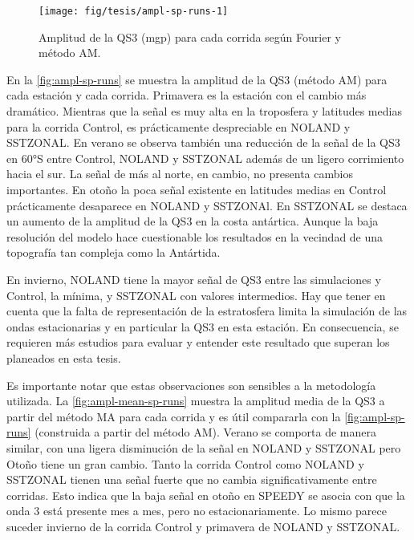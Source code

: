 \documentclass[spanish,a4paper,12pt,oneside]{book}
\begin{document}
\begin{landscape}\begin{figure}

{\centering \texttt{[image: fig/tesis/ampl-sp-runs-1]} 

}

\caption{Amplitud de la QS3 (mgp) para cada corrida según Fourier y método AM.}\label{fig:ampl-sp-runs}
\end{figure}
\end{landscape}

En la \autoref{fig:ampl-sp-runs} se muestra la amplitud de la QS3
(método AM) para cada estación y cada corrida. Primavera es la estación
con el cambio más dramático. Mientras que la señal es muy alta en la
troposfera y latitudes medias para la corrida Control, es prácticamente
despreciable en NOLAND y SSTZONAL. En verano se observa también una
reducción de la señal de la QS3 en 60°S entre Control, NOLAND y SSTZONAL
además de un ligero corrimiento hacia el sur. La señal de más al norte,
en cambio, no presenta cambios importantes. En otoño la poca señal
existente en latitudes medias en Control prácticamente desaparece en
NOLAND y SSTZONAl. En SSTZONAL se destaca un aumento de la amplitud de
la QS3 en la costa antártica. Aunque la baja resolución del modelo hace
cuestionable los resultados en la vecindad de una topografía tan
compleja como la Antártida.

En invierno, NOLAND tiene la mayor señal de QS3 entre las simulaciones y
Control, la mínima, y SSTZONAL con valores intermedios. Hay que tener en
cuenta que la falta de representación de la estratosfera limita la
simulación de las ondas estacionarias y en particular la QS3 en esta
estación. En consecuencia, se requieren más estudios para evaluar y
entender este resultado que superan los planeados en esta tesis.

Es importante notar que estas observaciones son sensibles a la
metodología utilizada. La \autoref{fig:ampl-mean-sp-runs} muestra la
amplitud media de la QS3 a partir del método MA para cada corrida y es
útil compararla con la \autoref{fig:ampl-sp-runs} (construida a partir
del método AM). Verano se comporta de manera similar, con una ligera
disminución de la señal en NOLAND y SSTZONAL pero Otoño tiene un gran
cambio. Tanto la corrida Control como NOLAND y SSTZONAL tienen una señal
fuerte que no cambia significativamente entre corridas. Esto indica que
la baja señal en otoño en SPEEDY se asocia con que la onda 3 está
presente mes a mes, pero no estacionariamente. Lo mismo parece suceder
invierno de la corrida Control y primavera de NOLAND y SSTZONAL.
\end{document}
